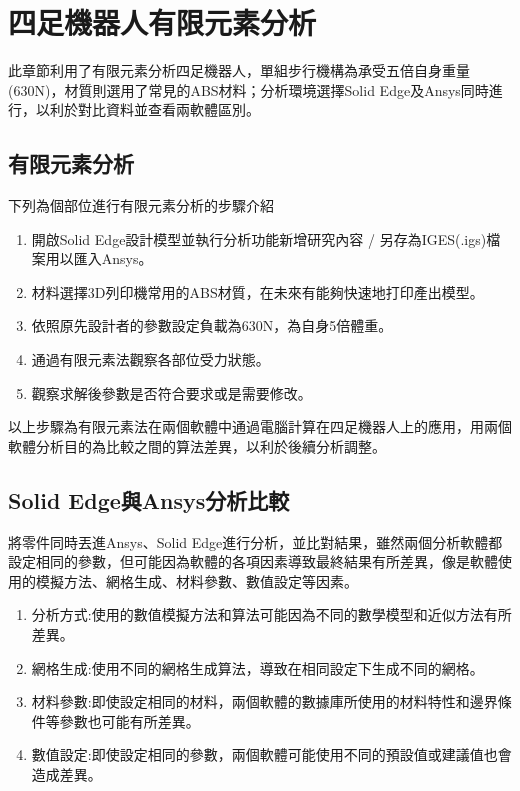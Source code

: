 \chapter{四足機器人有限元素分析}

此章節利用了有限元素分析四足機器人，單組步行機構為承受五倍自身重量(630N)，材質則選用了常見的ABS材料；分析環境選擇Solid Edge及Ansys同時進行，以利於對比資料並查看兩軟體區別。\\

\section{有限元素分析}
下列為個部位進行有限元素分析的步驟介紹
\begin{enumerate}
\item 開啟Solid Edge設計模型並執行分析功能新增研究內容 / 另存為IGES(.igs)檔案用以匯入Ansys。
\item 材料選擇3D列印機常用的ABS材質，在未來有能夠快速地打印產出模型。
\item 依照原先設計者的參數設定負載為630N，為自身5倍體重。
\item 通過有限元素法觀察各部位受力狀態。
\item 觀察求解後參數是否符合要求或是需要修改。\\

\end{enumerate}
以上步驟為有限元素法在兩個軟體中通過電腦計算在四足機器人上的應用，用兩個軟體分析目的為比較之間的算法差異，以利於後續分析調整。\\

\section{Solid Edge與Ansys分析比較}
將零件同時丟進Ansys、Solid Edge進行分析，並比對結果，雖然兩個分析軟體都設定相同的參數，但可能因為軟體的各項因素導致最終結果有所差異，像是軟體使用的模擬方法、網格生成、材料參數、數值設定等因素。\

\begin{enumerate}
\item 分析方式:使用的數值模擬方法和算法可能因為不同的數學模型和近似方法有所差異。
\item 網格生成:使用不同的網格生成算法，導致在相同設定下生成不同的網格。
\item 材料參數:即使設定相同的材料，兩個軟體的數據庫所使用的材料特性和邊界條件等參數也可能有所差異。
\item	數值設定:即使設定相同的參數，兩個軟體可能使用不同的預設值或建議值也會造成差異。\\

\end{enumerate}

